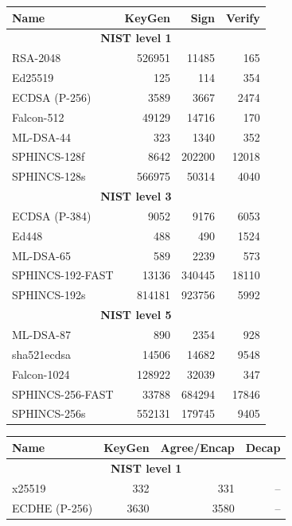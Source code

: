 \documentclass[letterpaper,12pt,titlepage,oneside,final]{book}
\begin{document}
\begin{table}[ht]
    \centering\scriptsize
    \begin{tabular}[t]{lrrr}
    \toprule
         {\bf Name} & {\bf KeyGen} & {\bf Sign} & {\bf Verify} \\
    \midrule
        \multicolumn{4}{c}{\bf NIST level 1} \\
    \midrule
        RSA-2048 & 526951 & 11485 & 165 \\
        Ed25519 & 125 & 114 & 354 \\
        ECDSA (P-256) & 3589 & 3667 & 2474 \\
        Falcon-512 & 49129 & 14716 & 170 \\
        ML-DSA-44 & 323 & 1340 & 352 \\
        SPHINCS-128f & 8642 & 202200 & 12018 \\
        SPHINCS-128s & 566975 & 50314 & 4040 \\
    \midrule
        \multicolumn{4}{c}{\bf NIST level 3} \\  
    \midrule
        ECDSA (P-384) & 9052 & 9176 & 6053 \\
        Ed448 & 488 & 490 & 1524 \\
        ML-DSA-65 & 589 & 2239 & 573 \\
        SPHINCS-192-FAST & 13136 & 340445 & 18110 \\
        SPHINCS-192s & 814181 & 923756 & 5992 \\
    \midrule
        \multicolumn{4}{c}{\bf NIST level 5} \\
    \midrule
        ML-DSA-87 & 890 & 2354 & 928 \\
        sha521ecdsa & 14506 & 14682 & 9548 \\
        Falcon-1024 & 128922 & 32039 & 347 \\
        SPHINCS-256-FAST & 33788 & 684294 & 17846 \\
        SPHINCS-256s & 552131 & 179745 & 9405 \\
    \bottomrule
    \end{tabular}
    \begin{tabular}[t]{lrrr}
    \toprule
         {\bf Name} & {\bf KeyGen} & {\bf Agree/Encap} & {\bf Decap} \\
    \midrule
        \multicolumn{4}{c}{\bf NIST level 1} \\
    \midrule
        x25519 & 332 & 331 & -- \\
        ECDHE (P-256) & 3630 & 3580 & -- \\

\end{tabular}
\end{table}
\end{document}
